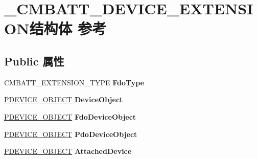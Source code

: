 \hypertarget{struct___c_m_b_a_t_t___d_e_v_i_c_e___e_x_t_e_n_s_i_o_n}{}\section{\+\_\+\+C\+M\+B\+A\+T\+T\+\_\+\+D\+E\+V\+I\+C\+E\+\_\+\+E\+X\+T\+E\+N\+S\+I\+O\+N结构体 参考}
\label{struct___c_m_b_a_t_t___d_e_v_i_c_e___e_x_t_e_n_s_i_o_n}
\subsection*{Public 属性}
\begin{DoxyCompactItemize}
\item 
\mbox{\label{struct___c_m_b_a_t_t___d_e_v_i_c_e___e_x_t_e_n_s_i_o_n_a111e0c8bb97946c4c235d5782d33c396}} 
C\+M\+B\+A\+T\+T\+\_\+\+E\+X\+T\+E\+N\+S\+I\+O\+N\+\_\+\+T\+Y\+PE {\bfseries Fdo\+Type}
\item 
\mbox{\label{struct___c_m_b_a_t_t___d_e_v_i_c_e___e_x_t_e_n_s_i_o_n_a9c3fa945aa3e78a147f80608a905fc41}} 
\hyperlink{struct___d_e_v_i_c_e___o_b_j_e_c_t}{P\+D\+E\+V\+I\+C\+E\+\_\+\+O\+B\+J\+E\+CT} {\bfseries Device\+Object}
\item 
\mbox{\label{struct___c_m_b_a_t_t___d_e_v_i_c_e___e_x_t_e_n_s_i_o_n_a6a144841a597552350b0ffd97693490a}} 
\hyperlink{struct___d_e_v_i_c_e___o_b_j_e_c_t}{P\+D\+E\+V\+I\+C\+E\+\_\+\+O\+B\+J\+E\+CT} {\bfseries Fdo\+Device\+Object}
\item 
\mbox{\label{struct___c_m_b_a_t_t___d_e_v_i_c_e___e_x_t_e_n_s_i_o_n_a440ff1665ea5c88f9e2e9625d1a198f1}} 
\hyperlink{struct___d_e_v_i_c_e___o_b_j_e_c_t}{P\+D\+E\+V\+I\+C\+E\+\_\+\+O\+B\+J\+E\+CT} {\bfseries Pdo\+Device\+Object}
\item 
\mbox{\label{struct___c_m_b_a_t_t___d_e_v_i_c_e___e_x_t_e_n_s_i_o_n_ab32d97e0fd0fa33d8340f7fdd702134e}} 
\hyperlink{struct___d_e_v_i_c_e___o_b_j_e_c_t}{P\+D\+E\+V\+I\+C\+E\+\_\+\+O\+B\+J\+E\+CT} {\bfseries Attached\+Device}

\end{DoxyCompactItemize}
